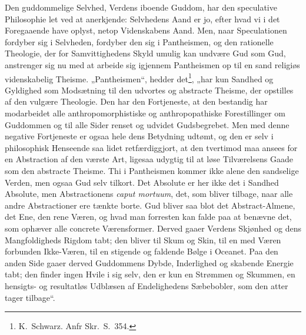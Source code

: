 \documentclass[12pt]{book}
\begin{document}
Den guddommelige Selvhed, Verdens iboende Guddom, har den
speculative Philosophie let ved at anerkjende: Selvhedens Aand er
jo, efter hvad vi i det Foregaaende have oplyst, netop Videnskabens
Aand. Men, naar Speculationen fordyber sig i Selvheden, fordyber den
sig i Pantheismen, og den rationelle Theologie, der for
Samvittighedens Skyld umulig kan undvære Gud som Gud, anstrenger sig
nu med at arbeide sig igjennem Pantheismen op til en sand religiøs
videnskabelig Theisme. „Pantheismen“, hedder
det\footnote{K.\ Schwarz. Anfr Skr.\ S.\ 354.}, „har kun Sandhed og
Gyldighed som Modsætning til den udvortes og abstracte Theisme, der
opstilles af den vulgære Theologie. Den har den Fortjeneste, at den
bestandig har modarbeidet alle anthropomorphistiske og
anthropopathiske Forestillinger om Guddommen og til alle Sider
renset og udvidet Gudsbegrebet. Men med denne negative Fortjeneste
er ogsaa hele dens Betydning udtømt, og den er selv i philosophisk
Henseende saa lidet retfærdiggjort, at den tvertimod maa ansees for
en Abstraction af den værste Art, ligesaa udygtig til at løse
Tilværelsens Gaade som den abstracte Theisme. Thi i Pantheismen
kommer ikke alene den sandselige Verden, men ogsaa Gud selv tilkort.
Det Absolute er her ikke det i Sandhed Absolute, men Abstractionens
\textit{caput mortuum}, det, som bliver tilbage, naar alle andre
Abstractioner ere tænkte borte. Gud bliver saa blot det
Abstract-Almene, det Ene, den rene Væren, og hvad man forresten kan
falde paa at benævne det, som ophæver alle concrete Værensformer.
Derved gaaer Verdens Skjønhed og dens Mangfoldigheds Rigdom tabt;
den bliver til Skum og Skin, til en med Væren forbunden
Ikke-Væren, til en stigende og faldende Bølge i Oceanet. Paa den
anden Side gaaer derved Guddommens Dybde, Inderlighed og skabende
Energie tabt; den finder ingen Hvile i sig selv, den er kun en
Strømmen og Skummen, en hensigts- og resultatløs Udblæsen af
Endelighedens Sæbebobler, som den atter tager tilbage“.
\end{document}
